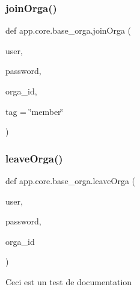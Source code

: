 \subsubsection{\texorpdfstring{join\+Orga()}{joinOrga()}}
{\footnotesize\ttfamily def app.\+core.\+base\+\_\+orga.\+join\+Orga (\begin{DoxyParamCaption}\item[{}]{user,  }\item[{}]{password,  }\item[{}]{orga\+\_\+id,  }\item[{}]{tag = {\ttfamily \char`\"{}member\char`\"{}} }\end{DoxyParamCaption})}

\begin{DoxyVerb}\end{DoxyVerb}
 \mbox{\label{namespaceapp_1_1core_1_1base__orga_aaa386431ed6a09fef2fc05fdc56070a3}} 
\subsubsection{\texorpdfstring{leave\+Orga()}{leaveOrga()}}
{\footnotesize\ttfamily def app.\+core.\+base\+\_\+orga.\+leave\+Orga (\begin{DoxyParamCaption}\item[{}]{user,  }\item[{}]{password,  }\item[{}]{orga\+\_\+id }\end{DoxyParamCaption})}

\begin{DoxyVerb}Ceci est un test de documentation
\end{DoxyVerb}
 